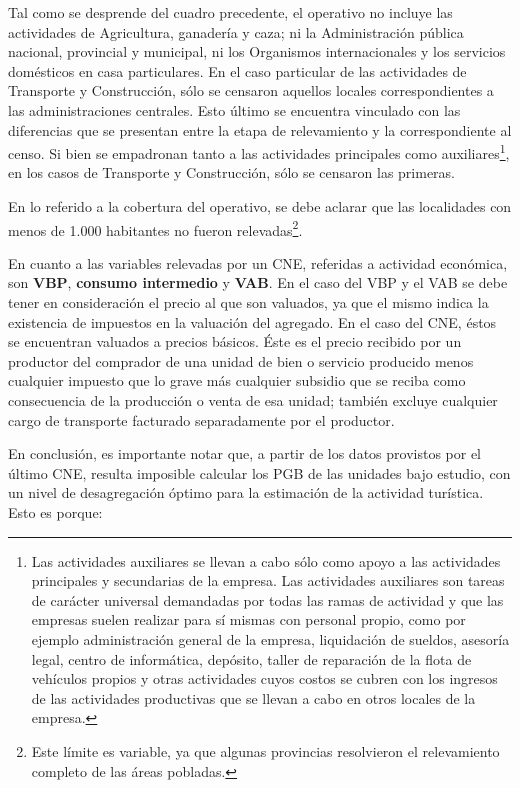 \documentclass[
  openany]{book}
\begin{document}
Tal como se desprende del cuadro precedente, el operativo no incluye las actividades de Agricultura, ganadería y caza; ni la Administración pública nacional, provincial y municipal, ni los Organismos internacionales y los servicios domésticos en casa particulares. En el caso particular de las actividades de Transporte y Construcción, sólo se censaron aquellos locales correspondientes a las administraciones centrales. Esto último se encuentra vinculado con las diferencias que se presentan entre la etapa de relevamiento y la correspondiente al censo. Si bien se empadronan tanto a las actividades principales como auxiliares\footnote{Las actividades auxiliares se llevan a cabo sólo como apoyo a las actividades principales y secundarias de la empresa. Las actividades auxiliares son tareas de carácter universal demandadas por todas las ramas de actividad y que las empresas suelen realizar para sí mismas con personal propio, como por ejemplo administración general de la empresa, liquidación de sueldos, asesoría legal, centro de informática, depósito, taller de reparación de la flota de vehículos propios y otras actividades cuyos costos se cubren con los ingresos de las actividades productivas que se llevan a cabo en otros locales de la empresa.}, en los casos de Transporte y Construcción, sólo se censaron las primeras.

En lo referido a la cobertura del operativo, se debe aclarar que las localidades con menos de 1.000 habitantes no fueron relevadas\footnote{Este límite es variable, ya que algunas provincias resolvieron el relevamiento completo de las áreas pobladas.}.

En cuanto a las variables relevadas por un CNE, referidas a actividad económica, son \textbf{VBP}, \textbf{consumo intermedio} y \textbf{VAB}. En el caso del VBP y el VAB se debe tener en consideración el precio al que son valuados, ya que el mismo indica la existencia de impuestos en la valuación del agregado. En el caso del CNE, éstos se encuentran valuados a precios básicos. Éste es el precio recibido por un productor del comprador de una unidad de bien o servicio producido menos cualquier impuesto que lo grave más cualquier subsidio que se reciba como consecuencia de la producción o venta de esa unidad; también excluye cualquier cargo de transporte facturado separadamente por el productor.

En conclusión, es importante notar que, a partir de los datos provistos por el último CNE, resulta imposible calcular los PGB de las unidades bajo estudio, con un nivel de desagregación óptimo para la estimación de la actividad turística. Esto es porque:
\end{document}
